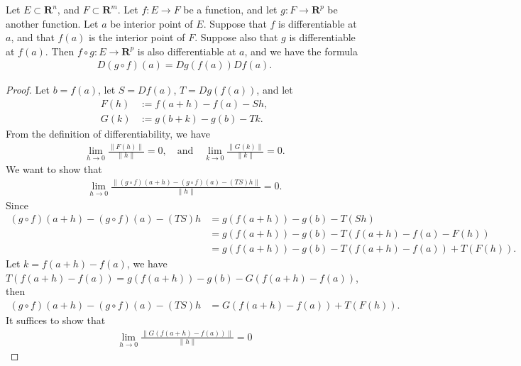\begin{theorem}
    Let $E \subset \mathbf{R}^n$, and $F \subset \mathbf{R}^m$. Let $f : E \to F$ be a function, and let $g : F \to \mathbf{R}^p$ be another function. Let $a$ be interior point of $E$. Suppose that $f$ is differentiable at $a$, and that $f(a)$ is the interior point of $F$. Suppose also that $g$ is differentiable at $f(a)$. Then $f \circ g : E \to \mathbf{R}^p$ is also differentiable at $a$, and we have the formula
        \begin{align*}
            D(g \circ f)(a) = Dg(f(a))Df(a).
        \end{align*}
\end{theorem}

\begin{proof}
    Let $b = f(a)$, let $S = Df(a)$, $T = Dg(f(a))$, and let
        \begin{align*}
            F(h) &:= f(a + h) - f(a) - Sh,\\
            G(k) &:= g(b + k) - g(b) - Tk.
        \end{align*}
    From the definition of differentiability, we have
        \begin{align*}
            \lim_{h \to 0}\frac{\|F(h)\|}{\|h\|} = 0,
            \quad \text{and}\quad
            \lim_{k \to 0}\frac{\|G(k)\|}{\|k\|} = 0.
        \end{align*}
    We want to show that
        \begin{align*}
            \lim_{h \to 0}\frac{\|(g \circ f)(a + h) - (g \circ f)(a) - (TS)h\|}{\|h\|} = 0.
        \end{align*}
    Since
        \begin{align*}
            (g \circ f)(a + h) - (g \circ f)(a) - (TS)h
            &= g(f(a + h)) - g(b) - T(Sh)\\
            &= g(f(a + h)) - g(b) - T(f(a + h) - f(a) - F(h))\\
            &= g(f(a + h)) - g(b) - T(f(a + h) - f(a)) + T(F(h)).
        \end{align*}
    Let $k = f(a + h) - f(a)$, we have $T(f(a + h) - f(a)) = g(f(a + h)) - g(b) - G(f(a + h) - f(a))$, then
        \begin{align*}
            (g \circ f)(a + h) - (g \circ f)(a) - (TS)h
            &= G(f(a + h) - f(a)) + T(F(h)).
        \end{align*}
It suffices to show that
        \begin{align*}
            \lim_{h \to 0}\frac{\|G(f(a + h) - f(a))\|}{\|h\|} = 0

\end{align*}
\end{proof}
